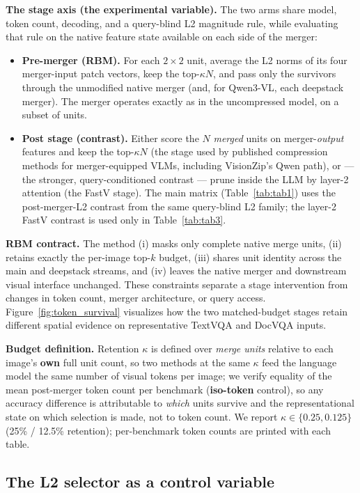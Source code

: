 \documentclass[journal]{IEEEtran}
\begin{document}
\textbf{The stage axis (the experimental variable).} The two arms share model,
token count, decoding, and a query-blind L2 magnitude rule, while evaluating
that rule on the native feature state available on each side of the merger:
\begin{itemize}
  \item \textbf{Pre-merger (RBM).} For each $2\!\times\!2$ unit, average the
    L2 norms of its four merger-input patch vectors, keep the top-$\kappa N$,
    and pass only the
    survivors through the unmodified native merger (and, for Qwen3-VL, each
    deepstack merger). The merger operates exactly as in the uncompressed model,
    on a subset of units.
  \item \textbf{Post stage (contrast).} Either score the $N$ \emph{merged} units
    on merger-\emph{output} features and keep the top-$\kappa N$ (the stage used
    by published compression methods for merger-equipped VLMs, including
    VisionZip's Qwen path), or --- the stronger, query-conditioned contrast ---
    prune inside the LLM by layer-2 attention (the FastV stage). The main
    matrix (Table~\ref{tab:tab1}) uses the post-merger-L2
    contrast from the same query-blind L2 family; the
    layer-2 FastV contrast is used only in Table~\ref{tab:tab3}.
\end{itemize}
\textbf{RBM contract.} The method (i) masks only complete native merge units,
(ii) retains exactly the per-image top-$k$ budget, (iii) shares unit identity
across the main and deepstack streams, and (iv) leaves the native merger and
downstream visual interface unchanged. These constraints separate a stage
intervention from changes in token count, merger architecture, or query access.
Figure~\ref{fig:token_survival} visualizes how the two matched-budget stages
retain different spatial evidence on representative TextVQA and DocVQA inputs.

\textbf{Budget definition.} Retention $\kappa$ is defined over \emph{merge
units} relative to each image's \textbf{own} full unit count, so two methods at
the same $\kappa$ feed the language model the same number of visual tokens per
image; we verify equality of the mean post-merger token count per benchmark
(\textbf{iso-token} control), so any accuracy difference is attributable to
\emph{which} units survive and the representational state on which selection is
made, not to token count. We report $\kappa \in \{0.25, 0.125\}$ (25\% / 12.5\%
retention); per-benchmark token counts are printed with each table.

\subsection{The L2 selector as a control variable}\label{sec:selector}
\end{document}

